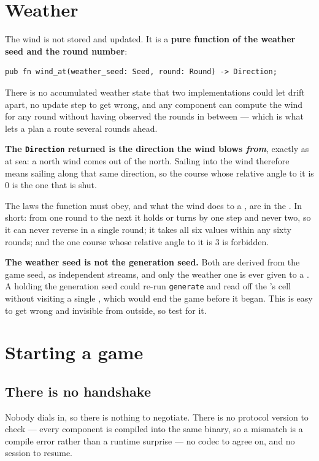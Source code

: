 \documentclass{article}
\begin{document}
\newpage
\section{Weather}
\label{proto:weather}

The wind is not stored and updated. It is a \textbf{pure function of the weather seed and the round
number}:

\begin{lstlisting}
pub fn wind_at(weather_seed: Seed, round: Round) -> Direction;
\end{lstlisting}

There is no accumulated weather state that two implementations could let drift apart, no update
step to get wrong, and any component can compute the wind for any round without having observed
the rounds in between --- which is what lets a \ship{} plan a route several rounds ahead.

\textbf{The \texttt{Direction} returned is the direction the wind blows \emph{from}}, exactly as
at sea: a north wind comes out of the north. Sailing into the wind therefore means sailing along
that same direction, so the course whose relative angle to it is $0$ is the one that is shut.

The laws the function must obey, and what the wind does to a \ship, are in the \MD. In short: from
one round to the next it holds or turns by one step and never two, so it can never reverse in a
single round; it takes all six values within any sixty rounds; and the one course whose relative
angle to it is $3$ is forbidden.

\textbf{The weather seed is not the generation seed.} Both are derived from the game seed, as
independent streams, and only the weather one is ever given to a \ship. A \ship{} holding the
generation seed could re-run \texttt{generate} and read off the \treasure{}'s cell without visiting
a single \island, which would end the game before it began. This is easy to get wrong and invisible
from outside, so test for it.

\newpage
\section{Starting a game}
\label{proto:connect}

\subsection{There is no handshake}

Nobody dials in, so there is nothing to negotiate. There is no protocol version to check --- every
component is compiled into the same binary, so a mismatch is a compile error rather than a runtime
surprise --- no codec to agree on, and no session to resume.
\end{document}
